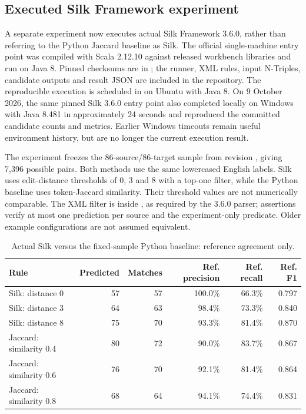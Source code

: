 \subsection{Executed Silk Framework experiment}
A separate experiment now executes actual Silk Framework 3.6.0, rather than referring
to the Python Jaccard baseline as Silk. The official single-machine entry point was
compiled with Scala 2.12.10 against released workbench libraries and run on Java 8.
Pinned checksums are in ; the runner, XML rules, input
N-Triples, candidate outputs and result JSON are included in the repository.
The reproducible execution is scheduled in  on
Ubuntu with Java 8. On 9 October 2026, the same pinned Silk 3.6.0 entry point also
completed locally on Windows with Java 8.481 in approximately 24 seconds and reproduced
the committed candidate counts and metrics. Earlier Windows timeouts remain useful
environment history, but are no longer the current execution result.

The experiment freezes the 86-source/86-target sample from revision ,
giving 7,396 possible pairs. Both methods use the same lowercased English labels.
Silk uses edit-distance thresholds of 0, 3 and 8 with a top-one filter, while the
Python baseline uses token-Jaccard similarity. Their threshold values are not
numerically comparable. The XML filter is inside , as required by
the 3.6.0 parser; assertions verify at most one prediction per source and the
experiment-only predicate. Older example configurations are not assumed equivalent.

\begin{table}[htbp]\centering\small
\caption{Actual Silk versus the fixed-sample Python baseline: reference agreement only.}
\label{tab:silk-real}
\begin{tabular}{lrrrrr}\toprule
Rule & Predicted & Matches & Ref. precision & Ref. recall & Ref. F1 \\\midrule
Silk: distance 0 & 57 & 57 & 100.0\% & 66.3\% & 0.797 \\
Silk: distance 3 & 64 & 63 & 98.4\% & 73.3\% & 0.840 \\
Silk: distance 8 & 75 & 70 & 93.3\% & 81.4\% & 0.870 \\
Jaccard: similarity 0.4 & 80 & 72 & 90.0\% & 83.7\% & 0.867 \\
Jaccard: similarity 0.6 & 76 & 70 & 92.1\% & 81.4\% & 0.864 \\
Jaccard: similarity 0.8 & 68 & 64 & 94.1\% & 74.4\% & 0.831 \\
\bottomrule\end{tabular}
\end{table}

